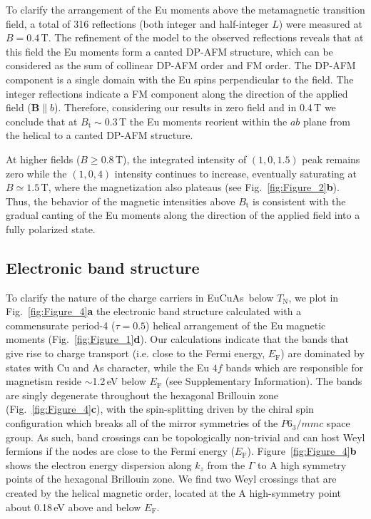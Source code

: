 \documentclass[aps,prl,amsmath,amssymb,amstext,citeautoscript,punctuation,nofootinbib,superscriptaddress,twocolumn]{revtex4-1}
\newcommand{\eca}{EuCuAs}
\begin{document}
To clarify the arrangement of the Eu moments above the metamagnetic transition field, a total of 316 reflections (both integer and half-integer $L$) were measured at $B=0.4$\,T. The refinement of the model to the observed reflections reveals that at this field the Eu moments form a canted DP-AFM structure, which can be considered as the sum of collinear DP-AFM order and FM order. The DP-AFM component is a single domain with the Eu spins perpendicular to the field. The integer reflections indicate a  FM component along the direction of the applied field ($\textbf{B} \parallel b$). Therefore, considering our results in zero field and in 0.4\,T we conclude that at $B_\mathrm{t} \sim 0.3$\,T the Eu moments reorient within the $ab$ plane from the helical to a canted DP-AFM structure.

At higher fields ($B \geq 0.8$\,T), the integrated intensity of $(1,0,1.5)$ peak remains zero while the $(1,0,4)$ intensity continues to increase, eventually saturating at $B \simeq 1.5$\,T, where the magnetization also plateaus (see Fig.~\ref{fig:Figure_2}\textbf{b}). Thus, the behavior of the magnetic intensities above $B_\mathrm{t}$ is consistent with the gradual canting of the Eu moments along the direction of the applied field into a fully polarized state.

	
\subsection{Electronic band structure}
To clarify the nature of the charge carriers in \eca\, below $T_\mathrm{N}$, we plot in Fig.~\ref{fig:Figure_4}\textbf{a} the electronic band structure calculated with a commensurate period-4 ($\tau = 0.5$) helical arrangement of the Eu magnetic moments (Fig.~\ref{fig:Figure_1}\textbf{d}). Our calculations indicate that the bands that give rise to charge transport (i.e. close to the Fermi energy, $E_\mathrm{F}$) are dominated by states with Cu and As character, while the Eu $4f$ bands which are responsible for magnetism reside $\sim$1.2\,eV below $E_\mathrm{F}$ (see Supplementary Information). The bands are singly degenerate throughout the hexagonal Brillouin zone (Fig.~\ref{fig:Figure_4}\textbf{c}), with the spin-splitting driven by the chiral spin configuration which breaks all of the mirror symmetries of the $P6_3/mmc$ space group. As such, band crossings can be topologically non-trivial and can host Weyl fermions if the nodes are close to the Fermi energy ($E_\mathrm{F}$). Figure~\ref{fig:Figure_4}\textbf{b} shows the electron energy dispersion along $k_z$ from the $\Gamma$ to A high symmetry points of the hexagonal Brillouin zone. We find two Weyl crossings that are created by the helical magnetic order, located at the A high-symmetry point about 0.18\,eV above and below $E_\mathrm{F}$.
	
\end{document}
